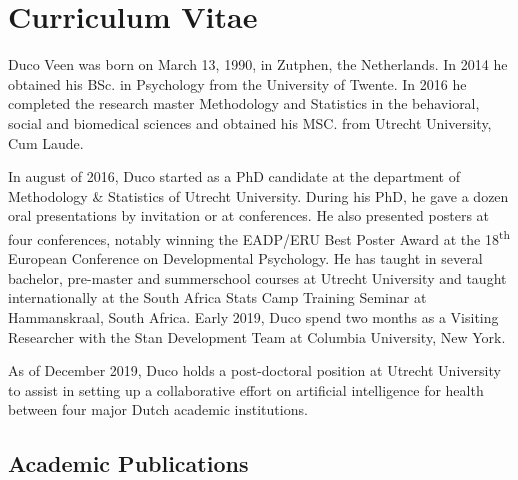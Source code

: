 \documentclass[openright,titlepage,12pt,a4paper]{book}
\begin{document}
\hypertarget{curriculum-vitae}{%
\chapter*{Curriculum Vitae}\label{curriculum-vitae}}

%

\thispagestyle{empty}


Duco Veen was born on March 13, 1990, in Zutphen, the Netherlands. In 2014 he obtained his BSc. in Psychology from the University of Twente. In 2016 he completed the research master Methodology and Statistics in the behavioral, social and biomedical sciences and obtained his MSC. from Utrecht University, Cum Laude.

In august of 2016, Duco started as a PhD candidate at the department of Methodology \& Statistics of Utrecht University. During his PhD, he gave a dozen oral presentations by invitation or at conferences. He also presented posters at four conferences, notably winning the EADP/ERU Best Poster Award at the 18\textsuperscript{th} European Conference on Developmental Psychology. He has taught in several bachelor, pre-master and summerschool courses at Utrecht University and taught internationally at the South Africa Stats Camp Training Seminar at Hammanskraal, South Africa. Early 2019, Duco spend two months as a Visiting Researcher with the Stan Development Team at Columbia University, New York.

As of December 2019, Duco holds a post-doctoral position at Utrecht University to assist in setting up a collaborative effort on artificial intelligence for health between four major Dutch academic institutions.

\hypertarget{academic-publications}{%
\section*{Academic Publications}\label{academic-publications}}
\end{document}
